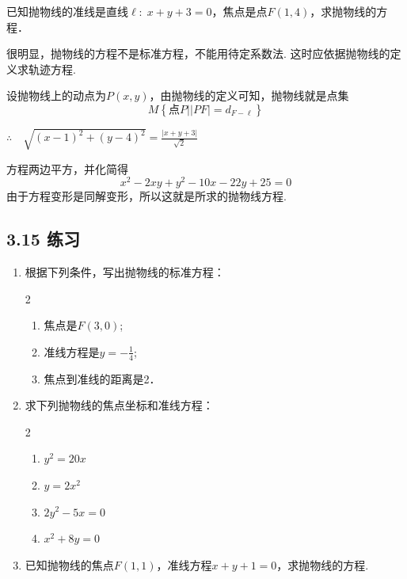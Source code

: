 \begin{example}
    已知抛物线的准线是直线$\ell:\; x+y+3=0$，焦点是点$F(1,4)$，求抛物线的方程．
\end{example}

\begin{analyze}
    很明显，抛物线的方程不是标准方程，不能用待定系数法. 这时应依据抛物线的定义求轨迹方程.
\end{analyze}



\begin{solution}
设抛物线上的动点为$P(x,y)$，由抛物线的定义可知，抛物线就是点集
\[M\left\{\text{点}P\Big| |PF|=d_{F-\ell}\right\}\]

$\therefore\quad \sqrt{(x-1)^2+(y-4)^2}=\frac{|x+y+3|}{\sqrt{2}}$

方程两边平方，并化简得
\[x^2-2xy+y^2-10x-22y+25=0\]
由于方程变形是同解变形，所以这就是所求的抛物线方程.
\end{solution}

\subsection*{3.15 练习}
\begin{enumerate}
\item 根据下列条件，写出抛物线的标准方程：
\begin{multicols}{2}
\begin{enumerate}[(1)]
    \item 焦点是$F(3,0)$;
    \item 准线方程是$y=-\frac{1}{4}$;
    \item 焦点到准线的距离是2．
\end{enumerate}
\end{multicols}

\item 求下列抛物线的焦点坐标和准线方程：
\begin{multicols}{2}
\begin{enumerate}[(1)]
    \item $y^2=20x$
    \item $y=2x^2$
    \item $2y^2-5x=0$
    \item $x^2+8y=0$
\end{enumerate}
\end{multicols}

\item 已知抛物线的焦点$F(1,1)$，准线方程$x+y+1=0$，求抛物线的方程.
\end{enumerate}

